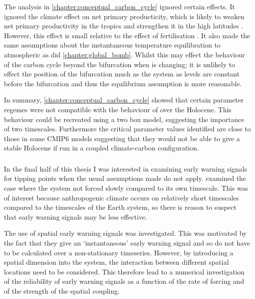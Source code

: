 The analysis in \cref{chapter:conceptual_carbon_cycle} ignored certain effects. It ignored the climate effect on net primary producticity, which is likely to weaken
net primary productivity in the tropics and strengthen it in the high latitudes .
However, this effect is small relative to the effect of  fertilisation \parencite{Arora2020}.
It also made the same assumptions about the instantaneous temperature equilibration to atmospheric  as did \cref{chapter:global_bomb}.
Whilst this may effect the behaviour of the carbon cycle beyond the bifurcation when  is changing;
it is unlikely to effect the position of the bifurcation much as the system as  levels are constant before the bifurcation and thus the equilibrium assumption is more reasonable.

In summary, \cref{chapter:conceptual_carbon_cycle} showed that certain parameter regemes were not compatible with the behaviour of  over the Holocene.
This behaviour could be recreated using a two box model, suggesting the importance of two timescales. Furthermore the critical parameter values identified are close to those in
some CMIP6 models suggesting that they would not be able to give a stable Holocene if run in a coupled climate-carbon configuration.

\subsubsection{}

In the final half of this thesis I was interested in examining early warning signals for tipping points when the usual assumptions made do not apply.
 examined the case where the system not forced slowly compared to its own timescale. This was of interest because anthropogenic climate
occurs on relatively short timescales compared to the timescales of the Earth system, so there is reason to suspect that early warning signals may be less effective.

The use of spatial early warning signals was investigated. This was motivated by the fact that they give an `instantaneous' early warning signal and so do not have
to be calculated over a non-stationary timeseries. However, by introducing a spatial dimension into the system, the interaction between different spatial locations
need to be considered. This therefore lead to a numerical investigation of the reliability of early warning signals as a function of the rate of forcing and of the strength of
the spatial coupling.

